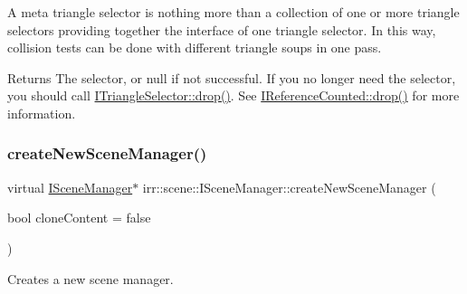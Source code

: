 A meta triangle selector is nothing more than a collection of one or more triangle selectors providing together the interface of one triangle selector. In this way, collision tests can be done with different triangle soups in one pass. \begin{DoxyReturn}{Returns}
The selector, or null if not successful. If you no longer need the selector, you should call \hyperlink{classirr_1_1IReferenceCounted_a03856a09355b89d178090c4a5f738543}{I\+Triangle\+Selector\+::drop()}. See \hyperlink{classirr_1_1IReferenceCounted_a03856a09355b89d178090c4a5f738543}{I\+Reference\+Counted\+::drop()} for more information. 
\end{DoxyReturn}
\mbox{\label{classirr_1_1scene_1_1ISceneManager_a94805dd4eca41ccef9607aefe669aed9}} 
\subsubsection{\texorpdfstring{create\+New\+Scene\+Manager()}{createNewSceneManager()}}
{\footnotesize\ttfamily virtual \hyperlink{classirr_1_1scene_1_1ISceneManager}{I\+Scene\+Manager}$\ast$ irr\+::scene\+::\+I\+Scene\+Manager\+::create\+New\+Scene\+Manager (\begin{DoxyParamCaption}\item[{bool}]{clone\+Content = {\ttfamily false} }\end{DoxyParamCaption})\hspace{0.3cm}{\ttfamily [pure virtual]}}



Creates a new scene manager. 

